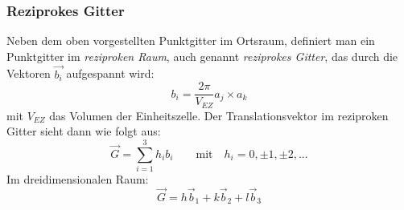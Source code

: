 \documentclass[a4paper,titlepage]{scrartcl}
\numberwithin{equation}{section}
\begin{document}
\subsubsection{Reziprokes Gitter}
Neben dem oben vorgestellten Punktgitter im Ortsraum, definiert man ein Punktgitter im \emph{reziproken Raum}, auch genannt \emph{reziprokes Gitter}, das durch die Vektoren $\vec{b_i}$ aufgespannt wird:
\begin{equation*}
b_i=\frac{2 \pi}{V_{EZ}} a_j \times a_k
\end{equation*}
mit $V_{EZ}$ das Volumen der Einheitszelle. Der Translationsvektor im reziproken Gitter sieht dann wie folgt aus:
\begin{equation*}
\vec{G}=\sum_{i=1}^3 h_i b_i \quad \quad \text{mit} \quad h_i=0, \pm 1, \pm 2, ...
\end{equation*}
Im dreidimensionalen Raum:
\begin{equation*}
\vec{G}=h \vec{b}_1+k \vec{b}_2+l \vec{b}_3
\end{equation*}
\end{document}
